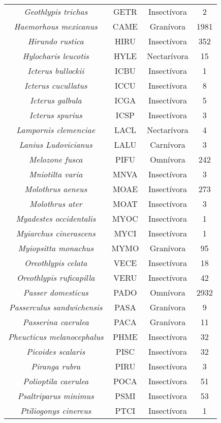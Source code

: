 \documentclass[letterpaper,12pt]{article}
\begin{document}
{\begin{longtable}[c] {|c|c|c|c|}
\textit{Geothlypis trichas} & GETR & Insectívora & 2\\
\textit{Haemorhous mexicanus} & CAME & Granívora & 1981\\
\textit{Hirundo rustica} & HIRU & Insectívora & 352\\
\textit{Hylocharis leucotis} & HYLE & Nectarívora & 15\\
\textit{Icterus bullockii} & ICBU & Insectívora & 1\\
\textit{Icterus cucullatus} & ICCU & Insectívora & 8\\
\textit{Icterus galbula} & ICGA & Insectívora & 5\\
\textit{Icterus spurius} & ICSP & Insectívora & 3\\
\textit{Lampornis clemenciae} & LACL & Nectarívora & 4\\
\textit{Lanius Ludovicianus} & LALU & Carnívora & 3\\
\textit{Melozone fusca} & PIFU & Omnívora & 242\\
\textit{Mniotilta varia} & MNVA & Insectívora & 3\\
\textit{Molothrus aeneus} & MOAE & Insectívora & 273\\
\textit{Molothrus ater} & MOAT & Insectívora & 3\\
\textit{Myadestes occidentalis} & MYOC & Insectívora & 1\\
\textit{Myiarchus cinerascens} & MYCI & Insectívora & 1\\
\textit{Myiopsitta monachus} & MYMO & Granívora & 95\\
\textit{Oreothlypis celata} & VECE & Insectívora & 18\\
\textit{Oreothlypis ruficapilla} & VERU & Insectívora & 42\\
\textit{Passer domesticus} & PADO & Omnívora & 2932\\
\textit{Passerculus sandwichensis} & PASA & Granívora & 9\\
\textit{Passerina caerulea} & PACA & Granívora & 11\\
\textit{Pheucticus melanocephalus} & PHME & Insectívora & 32\\
\textit{Picoides scalaris} & PISC & Insectívora & 32\\
\textit{Piranga rubra} & PIRU & Insectívora & 3\\
\textit{Polioptila caerulea} & POCA & Insectívora & 51\\
\textit{Psaltriparus minimus} & PSMI & Insectívora & 53\\
\textit{Ptiliogonys cinereus} & PTCI & Insectívora & 1\\

\end{longtable}}
\end{document}

